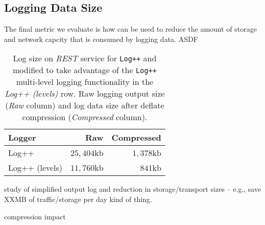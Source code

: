 \subsection{Logging Data Size}
The final metric we evaluate is how \projn can be used to reduce the amount of 
storage and network capcity that is consumed by logging data. ASDF

\begin{table}[t]  
    \centering
    {\small
    \begin{tabular}{l | r r }
    Logger        & Raw & Compressed \\
    \hline
    Log++          & $25,404$kb & $1,378$kb \\
    Log++ (levels) & $11,760$kb & $841$kb   \\
    \end{tabular}
    }
    \vspace{2mm}
    \caption{\small Log size on \emph{REST} service for \texttt{Log++}
    and modified to take advantage of the \texttt{Log++} 
    multi-level logging functionality in the \emph{Log++ (levels)} row. Raw 
    logging output size (\emph{Raw} column) and log data size after deflate 
    compression (\emph{Compressed} column).}
    \label{tab:compress}
\end{table}

study of simplified output log and reduction in storage/transport sizes -- 
e.g., save XXMB of traffic/storage per day kind of thing.

compression impact
